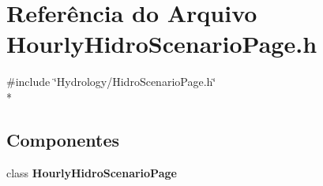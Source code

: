 \section{Referência do Arquivo Hourly\+Hidro\+Scenario\+Page.\+h}
\label{_hourly_hidro_scenario_page_8h}
{\ttfamily \#include \char`\"{}Hydrology/\+Hidro\+Scenario\+Page.\+h\char`\"{}}\\*
\subsection*{Componentes}
\begin{DoxyCompactItemize}
\item 
class {\bf Hourly\+Hidro\+Scenario\+Page}
\end{DoxyCompactItemize}
